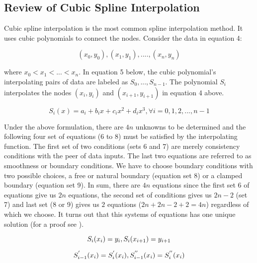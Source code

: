 \documentclass[12pt]{article}
\newcommand{\1}{\mathbbm 1}
\begin{document}
		
		
		\subsection{Review of Cubic Spline Interpolation}
		
		Cubic spline interpolation is the most common spline interpolation method. It uses cubic polynomials to connect the nodes. Consider the data in equation 4:
		
		\begin{equation}
			(x_{0}, y_{0}), (x_{1}, y_{1}), .... , (x_{n}, y_{n})
		\end{equation}
		
		
		where $x_{0} < x_{1} < ... < x_{n}$. In equation 5 below, the cubic polynomial's interpolating pairs of data are labeled as $S_{0},..., S_{n-1}$. The polynomial $S_{i}$ interpolates the nodes $(x_{i}, y_{i})$ and $(x_{i+1}, y_{i+1})$ in equation 4 above.
		
		
		\begin{equation}
			S_{i}(x) = a_{i} + b_{i}x + c_{i}x^{2} + d_{i}x^{3}, \forall i = 0, 1, 2, ... ,n-1
		\end{equation}
		
		
		Under the above formulation, there are $4n$ unknowns to be determined and the following four set of equations (6 to 8) must be satisfied by the interpolating function. The first set of two conditions (sets 6 and 7) are merely consistency conditions with the peer of data inputs. The last two equations are referred to as smoothness or boundary conditions. We have to choose boundary conditions with two possible choices, a free or natural boundary (equation set 8) or a clamped boundary (equation set 9). In sum, there are $4n$ equations since the first set 6 of equations give us $2n$ equations, the second set of conditions gives us $2n-2$ (set 7) and last set (8 or 9) gives us $2$ equations ($2n + 2n -2 + 2 = 4n$) regardless of which we choose. It turns out that this systems of equations has one unique solution (for a proof see \cite{burden2015numerical}).
		
		
		
		
		\begin{equation}
			S_{i}(x_{i}) = y_{i}, \\ S_{i}(x_{i+1}) = y_{i+1}
		\end{equation}
		
		\begin{equation}
			S_{i-1}^{'}(x_{i}) = S_{i}^{'}(x_{i}), \\ S_{i-1}^{''}(x_{i}) = S_{i}^{''}(x_{i})
		\end{equation}
		
\end{document}
